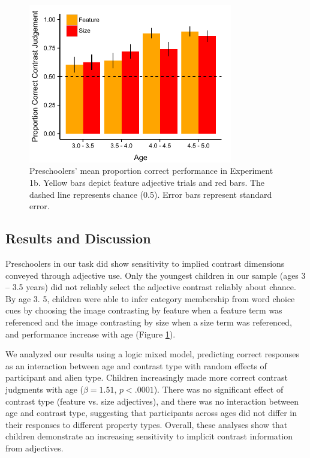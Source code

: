 \documentclass[10pt,letterpaper]{article}
\begin{document}
\begin{figure}[t] 
  \begin{center} 
    \includegraphics[width=3.5in]{figures/experiment1bResults.pdf} 
    \caption{\label{fig:kids1} Preschoolers' mean proportion correct performance in Experiment 1b. Yellow bars depict feature adjective trials and red bars. The dashed line represents chance (0.5). Error bars represent standard error.}
  \end{center} 
\end{figure}	




\subsection{Results and Discussion}

Preschoolers in our task did show sensitivity to implied contrast dimensions conveyed through adjective use.  Only the youngest children in our sample (ages 3 -- 3.5 years) did not reliably select the adjective contrast reliably about chance.  By age 3. 5, children were able to infer category membership from word choice cues by choosing the image contrasting by feature when a feature term was referenced and the image contrasting by size when a size term was referenced, and performance increase with age (Figure \ref{fig:kids1}).


We analyzed our results using a logic mixed model, predicting correct responses as an interaction between age and contrast type with random effects of participant and alien type.  Children increasingly made more correct contrast judgments with age ($\beta = 1.51$, $p < .0001$).
  There was no significant effect of contrast type (feature vs. size adjectives), and there was no interaction between age and contrast type, suggesting that participants across ages did not differ in their responses to different property types.  Overall, these analyses show that children demonstrate an increasing sensitivity to implicit contrast information from adjectives.  
\end{document}
